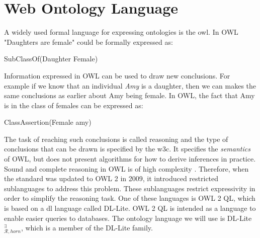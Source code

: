 \iffalse 
\section{Web Ontology Language}
A widely used formal language for expressing ontologies is the \gls{owl}. In OWL "Daughters are female" could be formally expressed as:

\centerline{\textsf{SubClassOf(Daughter Female)}}
Information expressed in OWL can be used to draw new conclusions. For example if we know that an individual \emph{Amy} is a daughter, then we can makes the same conclusions as earlier about Amy being female. In OWL, the fact that Amy is in the class of females can be expressed as:

\centerline{\textsf{ClassAssertion(Female amy)}}
The task of reaching such conclusions is called reasoning and the type of conclusions that can be drawn is specified by the \gls{w3c}. It specifies the \emph{semantics} of OWL, but does not present algorithms for how to derive inferences in practice. Sound and complete reasoning in OWL is of high complexity \cite{Krotzsch2012}. Therefore, when the standard was updated to OWL 2 in 2009, it introduced restricted sublanguages to address this problem. These sublanguages restrict expressivity in order to simplify the reasoning task. One of these languages is OWL 2 QL, which is based on a \gls{dl} language called DL-Lite. OWL 2 QL is intended as a language to enable easier queries to databases. The ontology language we will use is DL-Lite$_{\mathcal{R}, horn}^{\exists}$, which is a member of the DL-Lite family.



